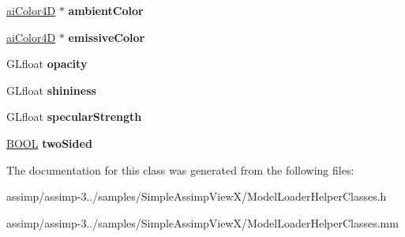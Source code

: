 \begin{DoxyCompactItemize}
\item 
\hypertarget{interface_mesh_helper_a780464b870d76e939887c44ab344caf6}{\hyperlink{structai_color4_d}{ai\+Color4\+D} $\ast$ {\bfseries ambient\+Color}}\label{interface_mesh_helper_a780464b870d76e939887c44ab344caf6}

\item 
\hypertarget{interface_mesh_helper_a99171702723062aa4e45e68664759af4}{\hyperlink{structai_color4_d}{ai\+Color4\+D} $\ast$ {\bfseries emissive\+Color}}\label{interface_mesh_helper_a99171702723062aa4e45e68664759af4}

\item 
\hypertarget{interface_mesh_helper_a6b410c548a3e78cc3742a0b3b02d88a2}{G\+Lfloat {\bfseries opacity}}\label{interface_mesh_helper_a6b410c548a3e78cc3742a0b3b02d88a2}

\item 
\hypertarget{interface_mesh_helper_ac6e5cdc9d17f33e67846addf3e9c51f0}{G\+Lfloat {\bfseries shininess}}\label{interface_mesh_helper_ac6e5cdc9d17f33e67846addf3e9c51f0}

\item 
\hypertarget{interface_mesh_helper_affce5e077e23e24e752b586ccab80dba}{G\+Lfloat {\bfseries specular\+Strength}}\label{interface_mesh_helper_affce5e077e23e24e752b586ccab80dba}

\item 
\hypertarget{interface_mesh_helper_a1f4065a5b7454ea9204bc3de7d828bf3}{\hyperlink{_ice_types_8h_a050c65e107f0c828f856a231f4b4e788}{B\+O\+O\+L} {\bfseries two\+Sided}}\label{interface_mesh_helper_a1f4065a5b7454ea9204bc3de7d828bf3}

\end{DoxyCompactItemize}


The documentation for this class was generated from the following files\+:\begin{DoxyCompactItemize}
\item 
assimp/assimp-\/3../samples/\+Simple\+Assimp\+View\+X/Model\+Loader\+Helper\+Classes.\+h\item 
assimp/assimp-\/3../samples/\+Simple\+Assimp\+View\+X/Model\+Loader\+Helper\+Classes.\+mm\end{DoxyCompactItemize}
